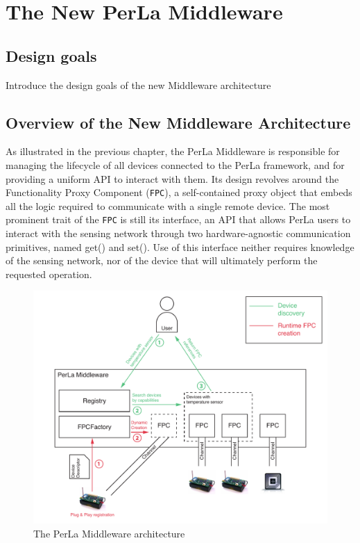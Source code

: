 \chapter{The New PerLa Middleware}
\label{cha:middleware_overview}

\section{Design goals}

Introduce the design goals of the new Middleware architecture

\section{Overview of the New Middleware Architecture}

As illustrated in the previous chapter, the PerLa Middleware is responsible for
managing the lifecycle of all devices connected to the PerLa framework, and for
providing a uniform API to interact with them. Its design revolves around the
Functionality Proxy Component (\texttt{FPC}), a self-contained proxy object
that embeds all the logic required to communicate with a single remote device.
The most prominent trait of the \texttt{FPC} is still its interface, an API
that allows PerLa users to interact with the sensing network through two
hardware-agnostic communication primitives, named get() and set(). Use of this
interface neither requires knowledge of the sensing network, nor of the device
that will ultimately perform the requested operation.

\begin{figure}[h!]
\includegraphics[width=\textwidth]{imgs/middleware_overview.pdf}
\caption{The PerLa Middleware architecture}
\end{figure}

